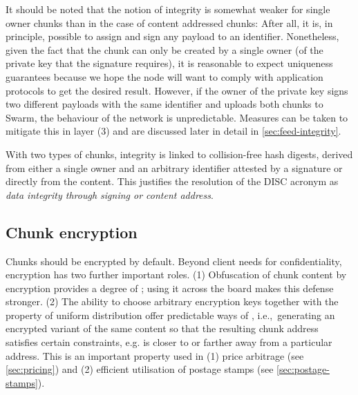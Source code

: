 It should be noted that the notion of integrity is somewhat weaker for single owner chunks than in the case of content addressed chunks: After all, it is, in principle, possible to assign and sign any payload to an identifier. Nonetheless, given the fact that the chunk can only be created by a single owner (of the private key that the signature requires), it is reasonable to expect uniqueness guarantees because we hope the node will want to comply with application protocols to get the desired result. However, if the owner of the private key signs two different payloads with the same identifier and uploads both chunks to Swarm, the behaviour of the network is unpredictable. Measures can be taken to mitigate this in layer (3) and are discussed later in detail in \ref{sec:feed-integrity}.

With two types of chunks, integrity is linked to collision-free hash digests, derived from either a single owner and an arbitrary identifier attested by a signature or directly from the content. This justifies the resolution of the DISC acronym as \emph{data integrity through signing or content address}.

\subsection{Chunk encryption\statusgreen}\label{sec:chunk-encryption}

Chunks should be encrypted by default. Beyond client needs for confidentiality, encryption has two further important roles. (1) Obfuscation of chunk content by encryption provides a degree of ; using it across the board makes this defense stronger. (2) The ability to choose arbitrary encryption keys together with the property of uniform distribution offer predictable ways of , i.e.,\ generating an encrypted variant of the same content so that the resulting chunk address satisfies certain constraints, e.g. is closer to or farther away from a particular address. This is an important property used in (1) price arbitrage (see \ref{sec:pricing}) and (2) efficient utilisation of postage stamps (see \ref{sec:postage-stamps}).


